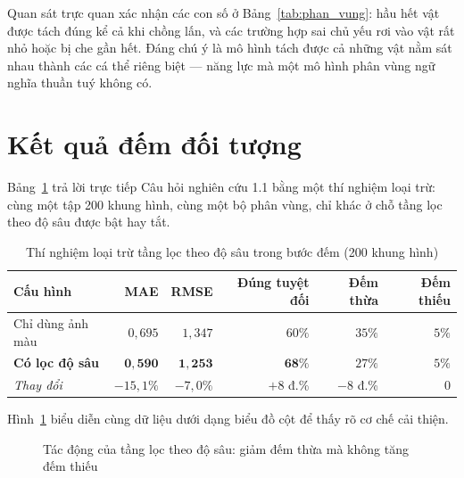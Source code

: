 Quan sát trực quan xác nhận các con số ở Bảng~\ref{tab:phan_vung}: hầu hết vật được tách đúng
kể cả khi chồng lấn, và các trường hợp sai chủ yếu rơi vào vật rất nhỏ hoặc bị che gần hết. Đáng
chú ý là mô hình tách được cả những vật nằm sát nhau thành các cá thể riêng biệt --- năng lực
mà một mô hình phân vùng ngữ nghĩa thuần tuý không có.

\section{Kết quả đếm đối tượng}

Bảng~\ref{tab:dem} trả lời trực tiếp Câu hỏi nghiên cứu 1.1 bằng một thí nghiệm loại trừ: cùng
một tập 200 khung hình, cùng một bộ phân vùng, chỉ khác ở chỗ tầng lọc theo độ sâu được bật hay
tắt.

\begin{table}[H]
\centering
\caption{Thí nghiệm loại trừ tầng lọc theo độ sâu trong bước đếm (200 khung hình)}
\label{tab:dem}
\small
\begin{tabular}{lrrrrr}
\toprule
\textbf{Cấu hình} & \textbf{MAE} & \textbf{RMSE} & \textbf{Đúng tuyệt đối} & \textbf{Đếm thừa} & \textbf{Đếm thiếu} \\
\midrule
Chỉ dùng ảnh màu       & $0{,}695$          & $1{,}347$          & $60\%$          & $35\%$ & $5\%$ \\
\textbf{Có lọc độ sâu} & $\mathbf{0{,}590}$ & $\mathbf{1{,}253}$ & $\mathbf{68\%}$ & $27\%$ & $5\%$ \\
\midrule
\textit{Thay đổi}      & $-15{,}1\%$ & $-7{,}0\%$ & $+8$ đ.\% & $-8$ đ.\% & $0$ \\
\bottomrule
\end{tabular}
\end{table}

Hình~\ref{fig:dem_chart} biểu diễn cùng dữ liệu dưới dạng biểu đồ cột để thấy rõ cơ chế cải
thiện.

\begin{figure}[H]
\centering
{}
\caption{Tác động của tầng lọc theo độ sâu: giảm đếm thừa mà không tăng đếm thiếu}
\label{fig:dem_chart}
\end{figure}

